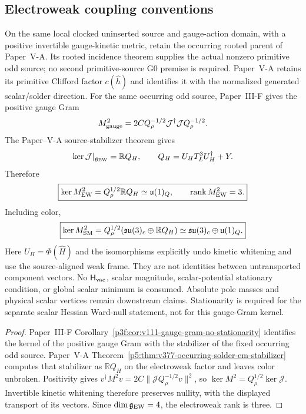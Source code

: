 \documentclass[12pt,a4paper]{article}
\newcommand{\Hvac}{\mathsf{H}_{\rm vac}}
\begin{document}
\subsection{Electroweak coupling conventions}
\label{p7v2:sec:ew-conventions}

\begin{theorem}
\label{p7v2:thm:v258-native-ew-solder-reduction}
On the same local clocked uninserted source and gauge-action domain, with a
positive invertible gauge-kinetic metric, retain the occurring rooted parent
of Paper~V-A.  Its rooted incidence
theorem supplies the actual nonzero primitive odd source; no second
primitive-source G0 premise is required.  Paper~V-A retains its primitive Clifford factor \(c(\hat h)\)
and identifies it with the normalized generated scalar/solder direction.  For
the same occurring odd source, Paper~III-F gives the positive gauge Gram
\[
 M_{\rm gauge}^2
 =2C Q_\rho^{-1/2}\mathcal J^\dagger\mathcal JQ_\rho^{-1/2}.
\]
The Paper--V-A source-stabilizer theorem gives
\[
 \ker\mathcal J|_{\mathfrak g_{\rm EW}}=\mathbb R Q_H,
 \qquad Q_H=U_HT_L^3U_H^\dagger+Y.
\]
Therefore
\[
 \boxed{\ker M_{\rm EW}^2=Q_\rho^{1/2}\mathbb R Q_H
 \simeq\mathfrak u(1)_Q,\qquad
 \operatorname{rank}M_{\rm EW}^2=3.}
\]
Including color,
\[
 \boxed{\ker M_{\rm SM}^2
 =Q_\rho^{1/2}(\mathfrak{su}(3)_c\oplus\mathbb R Q_H)
 \simeq\mathfrak{su}(3)_c\oplus\mathfrak u(1)_Q.}
\]
Here \(U_H=\Phi(\widehat H)\) and the isomorphisms explicitly undo
kinetic whitening and use the source-aligned weak frame.  They are not
identities between untransported component vectors.
No \(\Hvac\), scalar magnitude, scalar-potential stationary condition, or
global scalar minimum is consumed.  Absolute pole masses and physical scalar
vertices remain downstream claims.  Stationarity is required for the separate
scalar Hessian Ward-null statement, not for this gauge-Gram kernel.
\end{theorem}

\begin{proof}
Paper~III-F Corollary~\ref{p3f:cor:v111-gauge-gram-no-stationarity} identifies
the kernel of the positive gauge Gram with the stabilizer of the fixed
occurring odd source.  Paper~V-A
Theorem~\ref{p5:thm:v377-occurring-solder-em-stabilizer} computes that
stabilizer as \(\mathbb R Q_H\) on the electroweak factor and leaves color
unbroken.  Positivity gives
\(v^\dagger M^2v=2C\|\mathcal JQ_\rho^{-1/2}v\|^2\),
so \(\ker M^2=Q_\rho^{1/2}\ker\mathcal J\).
Invertible kinetic whitening therefore preserves nullity, with the displayed
transport of its vectors.  Since
\(\dim\mathfrak g_{\rm EW}=4\), the electroweak rank is three.
\end{proof}
\end{document}
